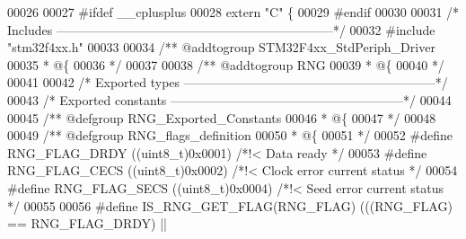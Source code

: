 \begin{DoxyCode}
00026 
00027 \textcolor{preprocessor}{#}\textcolor{preprocessor}{ifdef} \_\_cplusplus
00028  \textcolor{keyword}{extern} \textcolor{stringliteral}{"C"} \{
00029 \textcolor{preprocessor}{#}\textcolor{preprocessor}{endif}
00030 
00031 \textcolor{comment}{/* Includes ------------------------------------------------------------------*/}
00032 \textcolor{preprocessor}{#}\textcolor{preprocessor}{include} "stm32f4xx.h"
00033 
00034 \textcolor{comment}{/** @addtogroup STM32F4xx\_StdPeriph\_Driver}
00035 \textcolor{comment}{  * @\{}
00036 \textcolor{comment}{  */}
00037 
00038 \textcolor{comment}{/** @addtogroup RNG}
00039 \textcolor{comment}{  * @\{}
00040 \textcolor{comment}{  */}
00041 
00042 \textcolor{comment}{/* Exported types ------------------------------------------------------------*/}
00043 \textcolor{comment}{/* Exported constants --------------------------------------------------------*/}
00044 
00045 \textcolor{comment}{/** @defgroup RNG\_Exported\_Constants}
00046 \textcolor{comment}{  * @\{}
00047 \textcolor{comment}{  */}
00048 
00049 \textcolor{comment}{/** @defgroup RNG\_flags\_definition  }
00050 \textcolor{comment}{  * @\{}
00051 \textcolor{comment}{  */}
00052 \textcolor{preprocessor}{#}\textcolor{preprocessor}{define} \textcolor{preprocessor}{RNG\_FLAG\_DRDY}               \textcolor{preprocessor}{(}\textcolor{preprocessor}{(}\textcolor{preprocessor}{uint8\_t}\textcolor{preprocessor}{)}0x0001\textcolor{preprocessor}{)} \textcolor{comment}{/*!< Data ready */}
00053 \textcolor{preprocessor}{#}\textcolor{preprocessor}{define} \textcolor{preprocessor}{RNG\_FLAG\_CECS}               \textcolor{preprocessor}{(}\textcolor{preprocessor}{(}\textcolor{preprocessor}{uint8\_t}\textcolor{preprocessor}{)}0x0002\textcolor{preprocessor}{)} \textcolor{comment}{/*!< Clock error current status */}
00054 \textcolor{preprocessor}{#}\textcolor{preprocessor}{define} \textcolor{preprocessor}{RNG\_FLAG\_SECS}               \textcolor{preprocessor}{(}\textcolor{preprocessor}{(}\textcolor{preprocessor}{uint8\_t}\textcolor{preprocessor}{)}0x0004\textcolor{preprocessor}{)} \textcolor{comment}{/*!< Seed error current status */}
00055 
00056 \textcolor{preprocessor}{#}\textcolor{preprocessor}{define} \textcolor{preprocessor}{IS\_RNG\_GET\_FLAG}\textcolor{preprocessor}{(}\textcolor{preprocessor}{RNG\_FLAG}\textcolor{preprocessor}{)} \textcolor{preprocessor}{(}\textcolor{preprocessor}{(}\textcolor{preprocessor}{(}\textcolor{preprocessor}{RNG\_FLAG}\textcolor{preprocessor}{)} \textcolor{preprocessor}{==} RNG_FLAG_DRDY\textcolor{preprocessor}{)} \textcolor{preprocessor}{||}

\end{DoxyCode}
